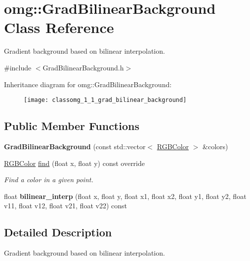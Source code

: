 \hypertarget{classomg_1_1_grad_bilinear_background}{}\section{omg\+::Grad\+Bilinear\+Background Class Reference}
\label{classomg_1_1_grad_bilinear_background}


Gradient background based on bilinear interpolation.  




{\ttfamily \#include $<$Grad\+Bilinear\+Background.\+h$>$}

Inheritance diagram for omg\+::Grad\+Bilinear\+Background\+:\begin{figure}[H]
\begin{center}
\leavevmode
\texttt{[image: classomg\_1\_1\_grad\_bilinear\_background]}
\end{center}
\end{figure}
\subsection*{Public Member Functions}
\begin{DoxyCompactItemize}
\item 
\mbox{\label{classomg_1_1_grad_bilinear_background_ab65634d8eb49ebe3303cb171d41b9d15}} 
{\bfseries Grad\+Bilinear\+Background} (const std\+::vector$<$ \mbox{\hyperlink{classtao_1_1_col}{R\+G\+B\+Color}} $>$ \&colors)
\item 
\mbox{\hyperlink{classtao_1_1_col}{R\+G\+B\+Color}} \mbox{\hyperlink{classomg_1_1_grad_bilinear_background_a074c489f7e8514420bd1e1f362202b03}{find}} (float x, float y) const override
\begin{DoxyCompactList}\small\item\em Find a color in a given point. \end{DoxyCompactList}\item 
\mbox{\label{classomg_1_1_grad_bilinear_background_a335f0acd0a4c56bcec29c33891ea5f44}} 
float {\bfseries bilinear\+\_\+interp} (float x, float y, float x1, float x2, float y1, float y2, float v11, float v12, float v21, float v22) const
\end{DoxyCompactItemize}


\subsection{Detailed Description}
Gradient background based on bilinear interpolation. 

